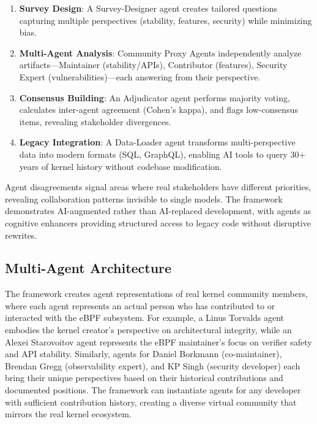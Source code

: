 \begin{enumerate}
    \item \textbf{Survey Design}: A Survey-Designer agent creates tailored questions capturing multiple perspectives (stability, features, security) while minimizing bias.

    \item \textbf{Multi-Agent Analysis}: Community Proxy Agents independently analyze artifacts—Maintainer (stability/APIs), Contributor (features), Security Expert (vulnerabilities)—each answering from their perspective.

    \item \textbf{Consensus Building}: An Adjudicator agent performs majority voting, calculates inter-agent agreement (Cohen's kappa), and flags low-consensus items, revealing stakeholder divergences.

    \item \textbf{Legacy Integration}: A Data-Loader agent transforms multi-perspective data into modern formats (SQL, GraphQL), enabling AI tools to query 30+ years of kernel history without codebase modification.

\end{enumerate}

Agent disagreements signal areas where real stakeholders have different priorities, revealing collaboration patterns invisible to single models. The framework demonstrates AI-augmented rather than AI-replaced development, with agents as cognitive enhancers providing structured access to legacy code without disruptive rewrites.

\subsection{Multi-Agent Architecture}

The framework creates agent representations of real kernel community members, where each agent represents an actual person who has contributed to or interacted with the eBPF subsystem. For example, a Linus Torvalds agent embodies the kernel creator's perspective on architectural integrity, while an Alexei Starovoitov agent represents the eBPF maintainer's focus on verifier safety and API stability. Similarly, agents for Daniel Borkmann (co-maintainer), Brendan Gregg (observability expert), and KP Singh (security developer) each bring their unique perspectives based on their historical contributions and documented positions. The framework can instantiate agents for any developer with sufficient contribution history, creating a diverse virtual community that mirrors the real kernel ecosystem.


